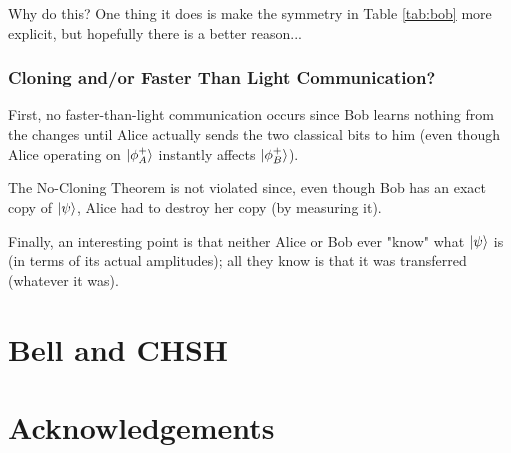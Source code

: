 \documentclass[11pt, oneside]{article}   	%
\begin{document}
\bigskip
\noindent
Why do this? One thing it does is make the symmetry in Table \ref{tab:bob} more explicit, but hopefully there is a better reason...


\subsubsection{Cloning and/or Faster Than Light Communication?}
First, no faster-than-light communication occurs since Bob learns nothing from the changes until Alice actually sends the two classical bits to him (even
though Alice operating on $\ket{\phi^{+}_A}$ instantly affects $\ket{\phi^{+}_B}$).

\bigskip
\noindent
The No-Cloning Theorem \cite{2018arXiv180804213E}  is not violated since, even though Bob has an exact copy of $\ket{\psi}$, Alice had to destroy her copy (by
measuring it). 

\bigskip
\noindent
Finally, an interesting point is that neither Alice or Bob ever "know"  what $\ket{\psi}$ is (in terms of its actual amplitudes); all they know
is that it was transferred (whatever it was). 

\section{Bell and  CHSH}

\bigskip
\noindent

\section{Acknowledgements}

\newpage


\end{document}
